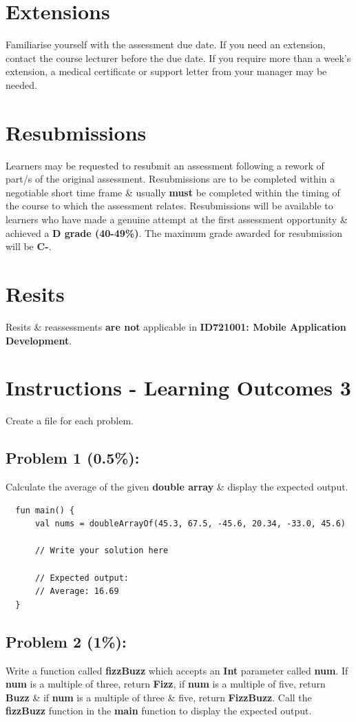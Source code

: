 \documentclass{article}
\begin{document}
\section*{Extensions}
Familiarise yourself with the assessment due date. If you need an extension, contact the course lecturer before the due date. If you require more than a week's extension, a medical certificate or support letter from your manager may be needed.

\section*{Resubmissions}
Learners may be requested to resubmit an assessment following a rework of part/s of the original assessment. Resubmissions are to be completed within a negotiable short time frame \& usually \textbf{must} be completed within the timing of the course to which the assessment relates. Resubmissions will be available to learners who have made a genuine attempt at the first assessment opportunity \& achieved a \textbf{D grade (40-49\%)}. The maximum grade awarded for resubmission will be \textbf{C-}.

\section*{Resits}
Resits \& reassessments \textbf{are not} applicable in \textbf{ID721001: Mobile Application Development}.

\section*{Instructions - Learning Outcomes 3}
Create a file for each problem.

\subsection*{Problem 1 (0.5\%):}
Calculate the average of the given \textbf{double array} \& display the expected output.

\begin{verbatim}
  fun main() {
      val nums = doubleArrayOf(45.3, 67.5, -45.6, 20.34, -33.0, 45.6)

      // Write your solution here

      // Expected output:
      // Average: 16.69 
  }
\end{verbatim}

\subsection*{Problem 2 (1\%):}
Write a function called \textbf{fizzBuzz} which accepts an \textbf{Int} parameter called \textbf{num}. If \textbf{num} is a multiple of three, return \textbf{Fizz}, if \textbf{num} is a multiple of five, return \textbf{Buzz} \& if \textbf{num} is a multiple of three \& five, return \textbf{FizzBuzz}. Call the \textbf{fizzBuzz} function in the \textbf{main} function to display the expected output.
\end{document}

